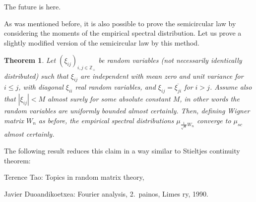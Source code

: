 \documentclass[12pt,a4paper,leqno]{report}
\newcommand{\Z}{\mathbb{Z}}
\theoremstyle{plain}
\newtheorem{theo}[equation]{Theorem}
\theoremstyle{definition}
\theoremstyle{remark}
\begin{document}
The future is here.

As was mentioned before, it is also possible to prove the semicircular law by considering the moments of the empirical spectral distribution. Let us prove a slightly modified version of the semicircular law by this method.

\begin{theo}
Let $(\xi_{ij})_{i,j \in \Z_+}$ be random variables (not necessarily identically distributed) such that $\xi_{ij}$
are independent with mean zero and unit variance for $i \leq j$, with diagonal $\xi_{ii}$ real random variables, and $\xi_{ij}=\overline{\xi_{ji}}$ for $i>j$. Assume also that $|\xi_{ij}|<M$ almost surely for some absolute constant $M$, in other words the random variables are uniformly bounded almost certainly.
Then, defining Wigner matrix $W_n$ as before, the empirical spectral distributions $\mu_{\frac{1}{\sqrt{n}}W_n}$ converge to $\mu_{sc}$ almost certainly.
\end{theo}

The following result reduces this claim in a way similar to Stieltjes continuity theorem:

\begin{thebibliography}{9}

Terence Tao: Topics in random matrix theory, 

Javier Duoandikoetxea: Fourier analysis, 2.\ painos, Limes ry, 1990.

\end{thebibliography}
\end{document}

